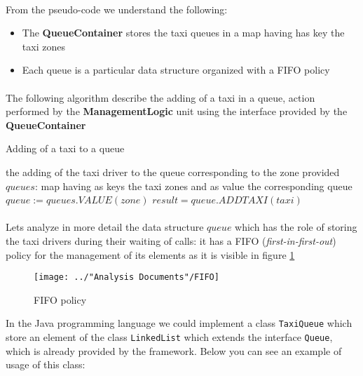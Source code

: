 \paragraph{}From the pseudo-code we understand the following:
\begin{itemize}
	\item The \textbf{QueueContainer} stores the taxi queues in a map having has key the taxi zones
	\item Each queue is a particular data structure organized with a FIFO policy
\end{itemize}
\paragraph{} The following algorithm describe the adding of a taxi in a queue, action performed by the \textbf{ManagementLogic} unit using the interface provided by the \textbf{QueueContainer}
\begin{algorithm}
\caption{Adding of a taxi to a queue}
\begin{algorithmic}
\ENSURE the adding of the taxi driver to the queue corresponding to the zone provided
\linebreak
\STATE $queues$: map having as keys the taxi zones and as value the corresponding queue \linebreak
$queue:= queues.VALUE(zone)$  \linebreak
$result = queue.ADDTAXI(taxi)$ 
\RETURN
\end{algorithmic}
\end{algorithm}
\paragraph{}Lets analyze in more detail the data structure $queue$ which has the role of storing the taxi drivers during their waiting of calls: it has a FIFO (\textit{first-in-first-out}) policy for the management of its elements as it is visible in figure \ref{fig:FIFOpolicy}
\begin{figure}[H]
	\centering
	\texttt{[image: ../"Analysis Documents"/FIFO]}
	\caption{FIFO policy}
	\label{fig:FIFOpolicy}
\end{figure}
In the Java programming language we could implement a class \texttt{TaxiQueue} which store an element of the class \texttt{LinkedList} which extends the interface \texttt{Queue}, which is already provided by the framework. Below you can see an example of usage of this class:

